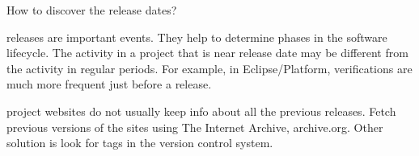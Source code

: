 
\Problem

How to discover the release dates?

\Context

releases are important events. They help to determine phases in the software lifecycle. The activity in a project that is near release date may be different from the activity in regular periods. For example, in Eclipse/Platform, verifications are much more frequent just before a release.

\Solution

project websites do not usually keep info about all the previous releases. Fetch previous versions of the sites using The Internet Archive, archive.org. Other solution is look for tags in the version control system.